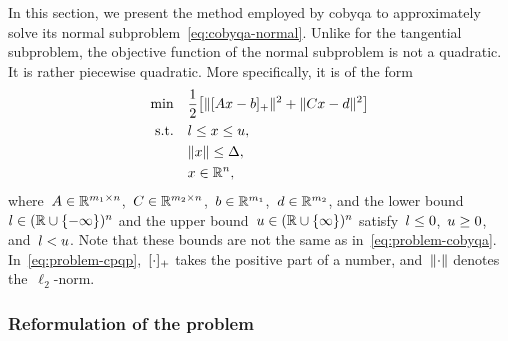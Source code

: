 In this section, we present the method employed by \gls{cobyqa} to approximately solve its normal subproblem~\cref{eq:cobyqa-normal}.
Unlike for the tangential subproblem, the objective function of the normal subproblem is not a quadratic.
It is rather piecewise quadratic.
More specifically, it is of the form
\begin{subequations}
    \label{eq:problem-cpqp}
    \begin{align}
        \min        & \quad \frac{1}{2} \big[ \norm{\posp{A \iter - b}}^2 + \norm{C \iter - d}^2 \big]\\
        \text{s.t.} & \quad \xl \le \iter \le \xu,\\
                    & \quad \norm{\iter} \le \rad,\\
                    & \quad \iter \in \R^n, \nonumber
    \end{align}
\end{subequations}
where~$A \in \mathbb{R}^{m_1 \times n}$,~$C \in \mathbb{R}^{m_2 \times n}$,~$b \in \mathbb{R}^{m_1}$,~$d \in \mathbb{R}^{m_2}$, and the lower bound~$l \in (\mathbb{R} \cup \{-\infty\})^n$ and the upper bound~$u \in (\mathbb{R} \cup \{\infty\})^n$ satisfy~$l \le 0$,~$u \ge 0$, and~$l < u$.
Note that these bounds are not the same as in~\cref{eq:problem-cobyqa}.
In~\cref{eq:problem-cpqp},~$[\cdot]_+$ takes the positive part of a number, and~$\lVert\cdot\rVert$ denotes the~$\ell_2$-norm.

\subsubsection{Reformulation of the problem}

